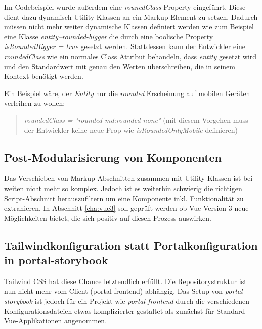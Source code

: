 

Im Codebeispiel wurde außerdem eine \textit{rounedClass} Property eingeführt. Diese dient dazu dynamisch Utility-Klassen an ein Markup-Element zu setzen. Dadurch müssen nicht mehr weiter dynamische Klassen definiert werden wie zum Beispiel eine Klasse \textit{entity--rounded-bigger} die durch eine boolische Property \textit{isRoundedBigger = true} gesetzt werden. Stattdessen kann der Entwickler eine \textit{roundedClass} wie ein normales Class Attribut behandeln, dass \textit{entity} gesetzt wird und den Standardwert mit genau den Werten überschreiben, die in seinem Kontext benötigt werden.

Ein Beispiel wäre, der \textit{Entity} nur die \textit{rounded} Erscheinung auf mobilen Geräten verleihen zu wollen: 

\begin{quotation}
	\textit{roundedClass = "rounded md:rounded-none"} (mit diesem Vorgehen muss der Entwickler keine neue Prop wie \textit{isRoundedOnlyMobile} definieren)
\end{quotation}

\subsection{Post-Modularisierung von Komponenten}
\label{subsec:postSplitting}
Das Verschieben von Markup-Abschnitten zusammen mit Utility-Klassen ist bei weiten nicht mehr so komplex. Jedoch ist es weiterhin schwierig die richtigen Script-Abschnitt herauszufiltern um eine Komponente inkl. Funktionalität zu extrahieren. In Abschnitt \ref{cha:vue3} soll geprüft werden ob Vue Version 3 neue Möglichkeiten bietet, die sich positiv auf diesen Prozess auswirken.

\subsection{Tailwindkonfiguration  statt  Portalkonfiguration  in  portal-storybook}
\label{subsec:tailwindConfVSPortalConf}
Tailwind CSS hat diese Chance letztendlich erfüllt. Die Repositorystruktur ist nun nicht mehr vom Client (portal-frontend) abhängig. Das Setup von \textit{portal-storybook} ist jedoch für ein Projekt wie \textit{portal-frontend} durch die verschiedenen Konfigurationsdateien etwas komplizierter gestaltet als zunächst für Standard-Vue-Applikationen angenommen.

